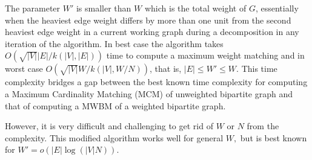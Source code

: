 \documentclass[runningheads,a4paper]{llncs}
\begin{document}
The parameter $W'$ is smaller than $W$ which is the total weight of $G$, 
 essentially when the heaviest edge weight differs by more than one unit from the
second heaviest edge weight in a current working graph 
during a decomposition in any iteration of the algorithm. 
In best case the algorithm
takes $O(\sqrt{|V|}|E|/k(|V|,|E|))$ time to compute a maximum weight matching  
and in worst case $O(\sqrt{|V|}W/k(|V|,W/N))$,
that is,  $|E| \leq W' \leq W$.
This time complexity bridges a gap between the best known time complexity for computing a 
Maximum Cardinality Matching (MCM) of unweighted bipartite graph and that of computing a MWBM of a weighted bipartite graph.

However, it is very difficult and challenging to get rid of $W$ or $N$ from the complexity.
This modified algorithm works well for general $W,$ but is  best known for $W'=o(|E| \log(|V|N))$. 
\end{document}
